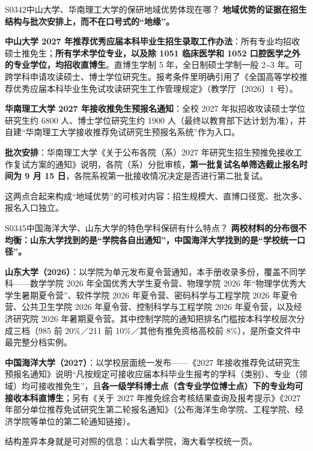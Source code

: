 \begin{qa}{S0342}{中山大学、华南理工大学的保研地域优势体现在哪？}
\textbf{地域优势的证据在招生结构与批次安排上，而不在口号式的“地缘”。}

\textbf{中山大学 2027 年推荐优秀应届本科毕业生招生录取工作办法}：所有专业均招收硕士推免生；\textbf{所有学术学位专业，以及除 1051 临床医学和 1052 口腔医学之外的专业学位，均招收直博生}。直博生学制 5 年，全日制硕士学制一般 2\textasciitilde{}3 年。可跨学科申请攻读硕士、博士学位研究生。报考条件里明确引用了《全国高等学校推荐优秀应届本科毕业生免试攻读研究生工作管理规定》（教学厅〔2026〕1 号）。

\textbf{华南理工大学 2027 年接收推免生预报名通知}：全校 2027 年拟招收攻读硕士学位研究生约 6800 人、博士学位研究生约 1900 人（最终以教育部下达计划为准），并自建“华南理工大学接收推荐免试研究生预报名系统”作为入口。

\textbf{批次安排}：华南理工大学《关于公布各院（系）2027 年研究生招生预推免接收工作复试方案的通知》说明，各院（系）分批审核，\textbf{第一批复试名单筛选截止报名时间为 9 月 15 日}，各院系视第一批接收情况决定是否进行第二批复试。

这两点合起来构成“地域优势”的可核对内容：招生规模大、直博口径宽、批次多、报名入口独立。
\end{qa}

\begin{qa}{S0345}{中国海洋大学、山东大学的特色学科保研有什么特点？}
\textbf{两校材料的分布很不均衡：山东大学找到的是“学院各自出通知”，中国海洋大学找到的是“学校统一口径”。}

\textbf{山东大学（2026）}：以学院为单元发布夏令营通知，本手册收录多份，覆盖不同学科——数学学院 2026 年全国优秀大学生夏令营、物理学院 2026 年“物理学优秀大学生暑期夏令营”、软件学院 2026 年夏令营、密码科学与工程学院 2026 年夏令营、公共卫生学院 2026 年夏令营、控制科学与工程学院 2026 年夏令营，以及经济研究院 2026 年暑期夏令营。其中控制学院的通知把排名门槛按本科学校层次分成三档（985 前 20\%／211 前 10\%／其他有推免资格高校前 8\%），是所查文件中最完整分档实例。

\textbf{中国海洋大学（2027）}：以学校层面统一发布——《2027 年接收推荐免试研究生预报名通知》说明“凡按规定可接收应届本科毕业生报考的学科（类别）、专业（领域）均可接收推免生”，且\textbf{各一级学科博士点（含专业学位博士点）下的专业均可接收本科直博生}；另有《关于 2027 年推免综合考核结果查询及报考提示》《2027 年部分单位推荐免试研究生第二轮报名通知》（公布海洋生命学院、工程学院、经济学院等单位的第二轮通知链接）。

结构差异本身就是可对照的信息：山大看学院，海大看学校统一页。
\end{qa}

